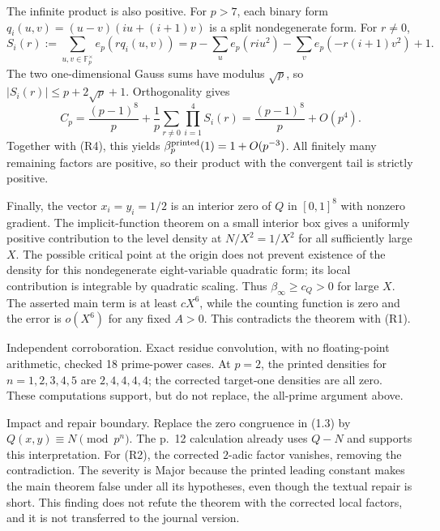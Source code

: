\documentclass[10pt]{article}
\begin{document}
The infinite product is also positive. For \(p>7\), each binary form \(q_i(u,v)=(u-v)(iu+(i+1)v)\) is a split nondegenerate form. For \(r\ne0\), \[S_i(r):=\sum_{u,v\in\mathbb F_p^\times}e_p(rq_i(u,v))
 =p-\sum_u e_p(ri u^2)-\sum_v e_p(-r(i+1)v^2)+1.\] The two one-dimensional Gauss sums have modulus \(\sqrt p\), so \(|S_i(r)|\le p+2\sqrt p+1\). Orthogonality gives \[C_p=\frac{(p-1)^8}{p}
       +\frac1p\sum_{r\ne0}\prod_{i=1}^4S_i(r)
     =\frac{(p-1)^8}{p}+O(p^4).\] Together with (R4), this yields \(\beta_p^{\rm printed}(1)=1+O(p^{-3})\). All finitely many remaining factors are positive, so their product with the convergent tail is strictly positive.\par
Finally, the vector \(x_i=y_i=1/2\) is an interior zero of \(Q\) in \([0,1]^8\) with nonzero gradient. The implicit-function theorem on a small interior box gives a uniformly positive contribution to the level density at \(N/X^2=1/X^2\) for all sufficiently large \(X\). The possible critical point at the origin does not prevent existence of the density for this nondegenerate eight-variable quadratic form; its local contribution is integrable by quadratic scaling. Thus \(\beta_\infty\ge c_Q>0\) for large \(X\). The asserted main term is at least \(cX^6\), while the counting function is zero and the error is \(o(X^6)\) for any fixed \(A>0\). This contradicts the theorem with (R1).\par
Independent corroboration. Exact residue convolution, with no floating-point arithmetic, checked 18 prime-power cases. At \(p=2\), the printed densities for \(n=1,2,3,4,5\) are \(2,4,4,4,4\); the corrected target-one densities are all zero. These computations support, but do not replace, the all-prime argument above.\par
Impact and repair boundary. Replace the zero congruence in (1.3) by \(Q(x,y)\equiv N\pmod {p^n}\). The p. 12 calculation already uses \(Q-N\) and supports this interpretation. For (R2), the corrected \(2\)-adic factor vanishes, removing the contradiction. The severity is Major because the printed leading constant makes the main theorem false under all its hypotheses, even though the textual repair is short. This finding does not refute the theorem with the corrected local factors, and it is not transferred to the journal version.\par
\end{document}
